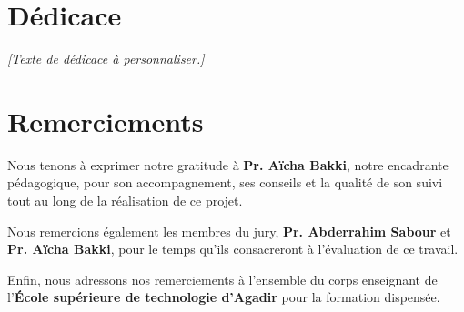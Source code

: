\chapter*{Dédicace}

\noindent\textit{[Texte de dédicace à personnaliser.]}

\vfill

\chapter*{Remerciements}

Nous tenons à exprimer notre gratitude à \textbf{Pr. Aïcha Bakki}, notre encadrante pédagogique, pour son accompagnement, ses conseils et la qualité de son suivi tout au long de la réalisation de ce projet.

Nous remercions également les membres du jury, \textbf{Pr. Abderrahim Sabour} et \textbf{Pr. Aïcha Bakki}, pour le temps qu'ils consacreront à l'évaluation de ce travail.

Enfin, nous adressons nos remerciements à l'ensemble du corps enseignant de l'\textbf{École supérieure de technologie d'Agadir} pour la formation dispensée.

\vfill
